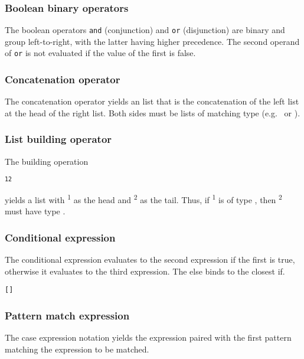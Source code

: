 \subsubsection{Boolean binary operators}
The boolean operators \texttt{and} (conjunction) and \texttt{or} (disjunction) are binary and group left-to-right, with the latter having higher precedence. 
The second operand of \texttt{or} is not evaluated if the value of the first is false.
\begin{alltt}
\quad {}  
\quad {}  
\end{alltt}

\subsubsection{Concatenation operator} 
The concatenation operator yields an list that is the concatenation of the left list at the head of the right list. Both sides must be lists of matching type (e.g.~ or ). 
\begin{alltt}
\quad {}  
\end{alltt}

\subsubsection{List building operator}
The building operation
\begin{alltt}
\quad {}\textsuperscript{1} \term{::} \textsuperscript{2}
\end{alltt}
 yields a list with \textsuperscript{1} as the head and \textsuperscript{2} as the tail. Thus, if \textsuperscript{1} is of type , then \textsuperscript{2} must have type \term{[]}. 

\subsubsection{Conditional expression}
The conditional expression evaluates to the second expression if the first is true, otherwise it evaluates to the third expression. The else binds to the closest if.
\begin{alltt}
\quad {}    [ ]
\end{alltt}

\subsubsection{Pattern match expression}
The case expression notation yields the expression paired with the first pattern matching the expression to be matched.

